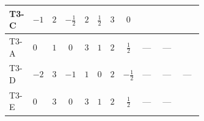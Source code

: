 \documentclass[8pt]{article}
\begin{document}
\begin{landscape}
\begin{longtable}{@{}llcccccc >{\raggedright\arraybackslash}p{0.21\linewidth} >{\raggedright\arraybackslash}p{0.21\linewidth} >{\raggedright\arraybackslash}p{0.21\linewidth}@{}}
\midrule
T3-C & $-1$ & $2$ & $-\frac{1}{2}$ & $2$ & $\frac{1}{2}$ & $3$ & $0$ & \scriptsize\adjustbox{max width=\linewidth}{$\begin{gathered} -9 {g_2}^2 {\lambda_{H2}^{\rm Adj}}\end{gathered}$} & \scriptsize\adjustbox{max width=\linewidth}{$\begin{gathered} +{\lambda_{12}^{\rm Adj}} {\lambda_{H1}^{\rm Adj}}\end{gathered}$} & \scriptsize\adjustbox{max width=\linewidth}{$\begin{gathered} +2 {\lambda_H} {\lambda_{H2}^{\rm Adj}}\end{gathered}$} \\
\midrule
T3-A & $0$ & $1$ & $0$ & $3$ & $1$ & $2$ & $\frac{1}{2}$ & --- & --- & \scriptsize\adjustbox{max width=\linewidth}{$\begin{gathered} +2 {\lambda_H} {\lambda_{H2}^{\rm Adj}}\end{gathered}$} \\
\midrule
T3-D & $-2$ & $3$ & $-1$ & $1$ & $0$ & $2$ & $-\frac{1}{2}$ & --- & --- & --- \\
\midrule
T3-E & $0$ & $3$ & $0$ & $3$ & $1$ & $2$ & $\frac{1}{2}$ & --- & --- & \scriptsize\adjustbox{max width=\linewidth}{$\begin{gathered} +2 {\lambda_H} {\lambda_{H2}^{\rm Adj}}\end{gathered}$} \\
\midrule
\bottomrule
\end{longtable}
\clearpage

\end{landscape}
\end{document}
